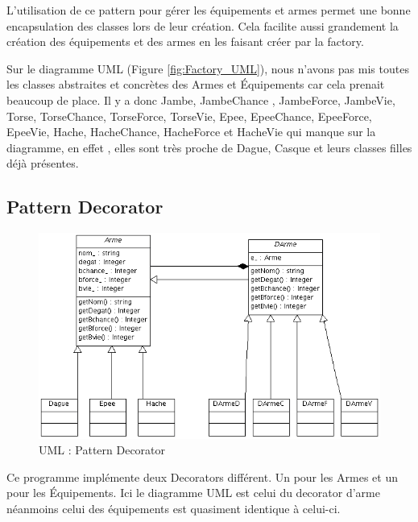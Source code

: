 \documentclass[a4paper]{article}
\begin{document}
L'utilisation de ce pattern pour gérer les équipements et armes permet une bonne encapsulation des classes lors de leur création.
Cela facilite aussi grandement la création des équipements et des armes en les faisant créer par la factory.

Sur le diagramme UML (Figure \ref{fig:Factory_UML}), nous n'avons pas mis toutes les classes abstraites et concrètes des Armes et Équipements car cela prenait beaucoup de place.
Il y a donc Jambe, JambeChance , JambeForce, JambeVie, Torse, TorseChance, TorseForce, TorseVie, Epee, EpeeChance, EpeeForce, EpeeVie, Hache, HacheChance, HacheForce et HacheVie qui manque sur la diagramme, en effet , elles sont très proche de Dague, Casque et leurs classes filles déjà présentes.


  \subsection{Pattern Decorator}
    \begin{figure}[h]
      \centering
      \includegraphics[width=15cm]{./Decorator_UML.png}
      \caption{\label{fig:Decorator_UML} UML : Pattern Decorator}
    \end{figure}

Ce programme implémente deux Decorators différent. Un pour les Armes et un pour les Équipements. Ici le diagramme UML est celui du decorator d'arme néanmoins celui des équipements est quasiment identique à celui-ci.
\end{document}
